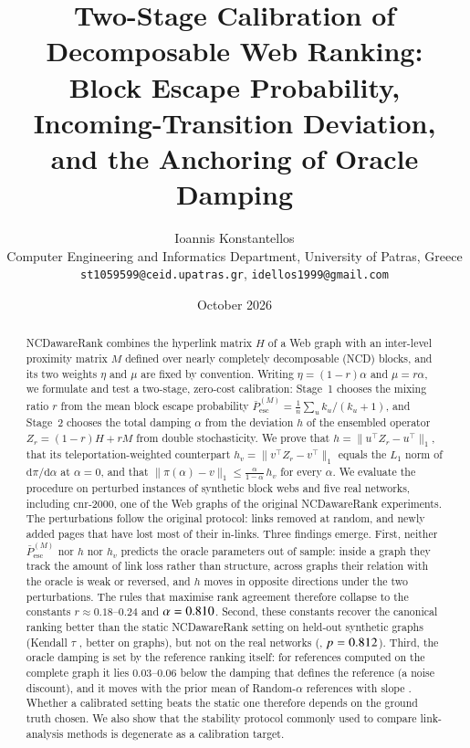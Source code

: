 \documentclass[11pt,a4paper]{article}
\title{\bfseries Two-Stage Calibration of Decomposable Web Ranking:\\
Block Escape Probability, Incoming-Transition Deviation,\\
and the Anchoring of Oracle Damping}
\author{Ioannis Konstantellos\\[2pt]
\small Computer Engineering and Informatics Department, University of Patras, Greece\\
\small\texttt{st1059599@ceid.upatras.gr}, \texttt{idellos1999@gmail.com}}
\date{October 2026}
\theoremstyle{definition}
\theoremstyle{remark}
\newcommand{\Pbar}{\bar P^{(M)}_{\mathrm{esc}}}
\begin{document}
\maketitle

\begin{abstract}
\noindent
NCDawareRank combines the hyperlink matrix $H$ of a Web graph with an inter-level proximity matrix
$M$ defined over nearly completely decomposable (NCD) blocks, and its two weights $\eta$ and $\mu$ are
fixed by convention. Writing $\eta=(1-r)\alpha$ and $\mu=r\alpha$, we formulate and test a two-stage,
zero-cost calibration: Stage~1 chooses the mixing ratio $r$ from the mean block escape probability
$\Pbar=\frac1n\sum_u k_u/(k_u+1)$, and Stage~2 chooses the total damping $\alpha$ from the deviation
$h$ of the ensembled operator $Z_r=(1-r)H+rM$ from double stochasticity. We prove that
$h=\|u^\top Z_r-u^\top\|_1$, that its teleportation-weighted counterpart $h_v=\|v^\top Z_r-v^\top\|_1$
equals the $L_1$ norm of $\mathrm d\pi/\mathrm d\alpha$ at $\alpha=0$, and that
$\|\pi(\alpha)-v\|_1\le\frac{\alpha}{1-\alpha}\,h_v$ for every $\alpha$. We evaluate the procedure on
\nInstTotal{} perturbed instances of synthetic block webs and five real networks, including cnr-2000,
one of the Web graphs of the original NCDawareRank experiments. The perturbations follow the original
protocol: links removed at random, and newly added pages that have lost most of their in-links.
Three findings emerge. First,
neither $\Pbar$ nor $h$ nor $h_v$ predicts the oracle parameters out of sample: inside a graph they track
the amount of link loss rather than structure, across graphs their relation with the oracle is weak or
reversed, and $h$ moves in opposite directions under the two perturbations. The rules that maximise
rank agreement therefore collapse to the constants
$r\approx0.18$--$0.24$ and $\alpha=0.810$. Second, these constants recover the canonical
ranking better than the static NCDawareRank setting on held-out synthetic graphs (Kendall $\tau$
\TwoTestD, better on \TwoTestWins{} graphs), but not on the real networks (\TwoRealD, $p=0.812$).
Third, the oracle damping is set by the reference ranking itself: for references computed on the
complete graph it lies $0.03$--$0.06$ below the damping that defines the reference (a noise discount),
and it moves with the prior mean of Random-$\alpha$ references with slope \RaprSlope. Whether a calibrated setting beats the static one therefore depends
on the ground truth chosen. We also show that the stability protocol commonly used to compare
link-analysis methods is degenerate as a calibration target.
\end{abstract}
\end{document}
